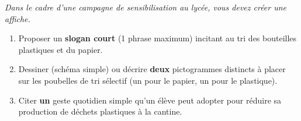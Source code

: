 \documentclass[11pt]{article}
\begin{document}
\begin{exercice}
\emph{Dans le cadre d'une campagne de sensibilisation au lycée, vous devez créer une affiche.}
\begin{enumerate}
    \item Proposer un \textbf{slogan court} (1 phrase maximum) incitant au tri des bouteilles plastiques et du papier.
    \item Dessiner (schéma simple) ou décrire \textbf{deux} pictogrammes distincts à placer sur les poubelles de tri sélectif (un pour le papier, un pour le plastique).
    \item Citer \textbf{un} geste quotidien simple qu'un élève peut adopter pour réduire sa production de déchets plastiques à la cantine.
\end{enumerate}
\end{exercice}
\end{document}
